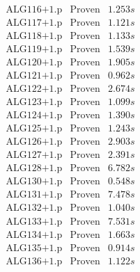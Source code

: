 \documentclass[a4paper,11pt]{report}
\theoremstyle{definition}
\theoremstyle{definition}
\theoremstyle{definition}
\theoremstyle{definition}
\theoremstyle{definition}
\theoremstyle{definition}
\theoremstyle{definition}
\begin{document}
\begin{minipage}{0.45\textwidth}
\[\begin{matrix}
			\text{ALG116+1.p}&\text{Proven}& 1.253 s\\
			\text{ALG117+1.p}&\text{Proven}& 1.121 s\\
			\text{ALG118+1.p}&\text{Proven}& 1.133 s\\
			\text{ALG119+1.p}&\text{Proven}& 1.539 s\\
			\text{ALG120+1.p}&\text{Proven}& 1.905 s\\
			\text{ALG121+1.p}&\text{Proven}& 0.962 s\\
			\text{ALG122+1.p}&\text{Proven}& 2.674 s\\
			\text{ALG123+1.p}&\text{Proven}& 1.099 s\\
			\text{ALG124+1.p}&\text{Proven}& 1.390 s\\
			\text{ALG125+1.p}&\text{Proven}& 1.243 s\\
			\text{ALG126+1.p}&\text{Proven}& 2.903 s\\
			\text{ALG127+1.p}&\text{Proven}& 2.391 s\\
			\text{ALG128+1.p}&\text{Proven}& 6.782 s\\
			\text{ALG130+1.p}&\text{Proven}& 0.548 s\\
			\text{ALG131+1.p}&\text{Proven}& 7.478 s\\
			\text{ALG132+1.p}&\text{Proven}& 1.040 s\\
			\text{ALG133+1.p}&\text{Proven}& 7.531 s\\
			\text{ALG134+1.p}&\text{Proven}& 1.663 s\\
			\text{ALG135+1.p}&\text{Proven}& 0.914 s\\
			\text{ALG136+1.p}&\text{Proven}& 1.122 s\\
		\end{matrix}\]
	\end{minipage}
\end{document}
